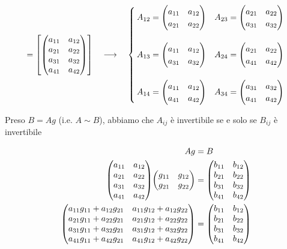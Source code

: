 \begin{equation}
	[A] = \left[ \mqty( a_{11} & a_{12} \\ a_{21} & a_{22} \\ a_{31} & a_{32} \\ a_{41} & a_{42} ) \right] \quad \longrightarrow \quad%
	\begin{cases}
		A_{12} = \mqty( a_{11} & a_{12} \\ a_{21} & a_{22} ) & A_{23} = \mqty( a_{21} & a_{22} \\ a_{31} & a_{32} )\\\\
		A_{13} = \mqty( a_{11} & a_{12} \\ a_{31} & a_{32} ) & A_{24} = \mqty( a_{21} & a_{22} \\ a_{41} & a_{42} )\\\\
		A_{14} = \mqty( a_{11} & a_{12} \\ a_{41} & a_{42} ) & A_{34} = \mqty( a_{31} & a_{32} \\ a_{41} & a_{42} )
	\end{cases}
\end{equation}

Preso $ B = A g $ (i.e. $ A \sim B $), abbiamo che $ A_{ij} $ è invertibile se e solo se $ B_{ij} $ è invertibile

\begin{align}
	\begin{split}
		A g &= B\\
		\mqty( a_{11} & a_{12} \\ a_{21} & a_{22} \\ a_{31} & a_{32} \\ a_{41} & a_{42} ) \mqty( g_{11} & g_{12} \\ g_{21} & g_{22} ) &= \mqty( b_{11} & b_{12} \\ b_{21} & b_{22} \\ b_{31} & b_{32} \\ b_{41} & b_{42} )\\
		\mqty( a_{11} g_{11} + a_{12} g_{21} & a_{11} g_{12} + a_{12} g_{22} \\ a_{21} g_{11} + a_{22} g_{21} & a_{21} g_{12} + a_{22} g_{22} \\ a_{31} g_{11} + a_{32} g_{21} & a_{31} g_{12} + a_{32} g_{22} \\ a_{41} g_{11} + a_{42} g_{21} & a_{41} g_{12} + a_{42} g_{22} ) &= \mqty( b_{11} & b_{12} \\ b_{21} & b_{22} \\ b_{31} & b_{32} \\ b_{41} & b_{42} )
	\end{split}
\end{align}

